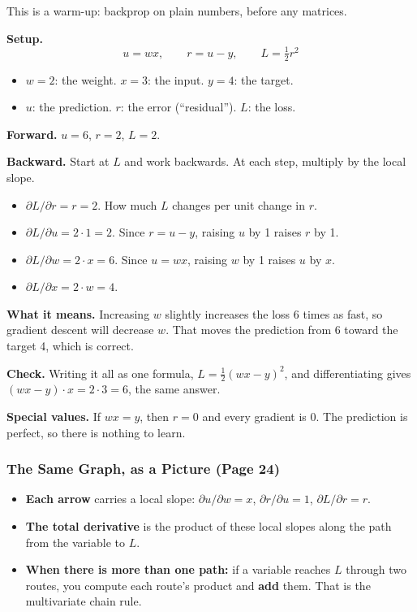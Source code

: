 This is a warm-up: backprop on plain numbers, before any matrices.

\textbf{Setup.}
\[
u = wx, \qquad r = u - y, \qquad L = \tfrac12 r^2
\]
\begin{itemize}
  \item $w = 2$: the weight. $x = 3$: the input. $y = 4$: the target.
  \item $u$: the prediction. $r$: the error (``residual''). $L$: the loss.
\end{itemize}

\textbf{Forward.} $u = 6$, $r = 2$, $L = 2$.

\textbf{Backward.} Start at $L$ and work backwards. At each step, multiply by the local slope.
\begin{itemize}
  \item $\partial L/\partial r = r = 2$. How much $L$ changes per unit change in $r$.
  \item $\partial L/\partial u = 2 \cdot 1 = 2$. Since $r = u - y$, raising $u$ by 1 raises $r$ by 1.
  \item $\partial L/\partial w = 2 \cdot x = 6$. Since $u = wx$, raising $w$ by 1 raises $u$ by $x$.
  \item $\partial L/\partial x = 2 \cdot w = 4$.
\end{itemize}

\textbf{What it means.} Increasing $w$ slightly increases the loss 6 times as fast, so gradient descent will decrease $w$. That moves the prediction from 6 toward the target 4, which is correct.

\textbf{Check.} Writing it all as one formula, $L = \tfrac12(wx - y)^2$, and differentiating gives $(wx - y)\cdot x = 2 \cdot 3 = 6$, the same answer.

\textbf{Special values.} If $wx = y$, then $r = 0$ and every gradient is 0. The prediction is perfect, so there is nothing to learn.

\subsubsection*{The Same Graph, as a Picture (Page 24)}

\begin{itemize}
  \item \textbf{Each arrow} carries a local slope: $\partial u/\partial w = x$, $\partial r/\partial u = 1$, $\partial L/\partial r = r$.
  \item \textbf{The total derivative} is the product of these local slopes along the path from the variable to $L$.
  \item \textbf{When there is more than one path:} if a variable reaches $L$ through two routes, you compute each route's product and \textbf{add} them. That is the multivariate chain rule.
\end{itemize}

